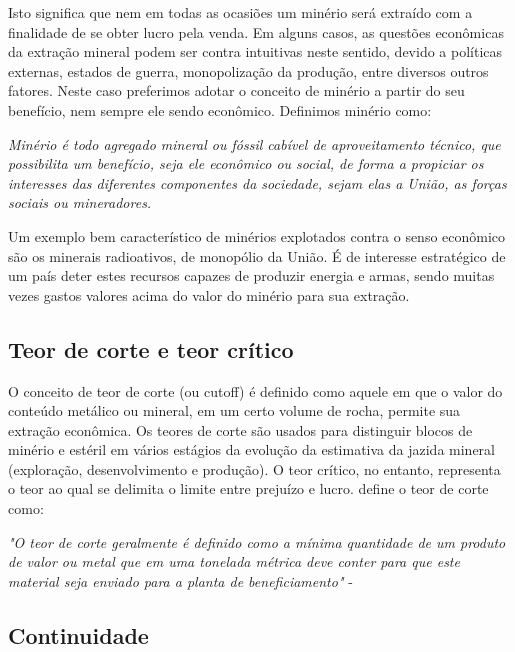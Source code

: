 Isto significa que nem em todas as ocasiões um minério será extraído com a finalidade de se obter lucro pela venda. Em alguns casos, as questões econômicas da extração mineral podem ser contra intuitivas neste sentido, devido a políticas externas, estados de guerra, monopolização da produção, entre diversos outros fatores. Neste caso preferimos adotar o conceito de minério a partir do seu benefício, nem sempre ele sendo econômico. Definimos minério como: 

\begin{definition}[Minério]
	\textit{Minério é todo agregado mineral ou fóssil cabível de aproveitamento técnico, que possibilita um benefício, seja ele econômico ou social, de forma a propiciar os interesses das diferentes componentes da sociedade, sejam elas a União, as forças sociais ou mineradores.}
\end{definition}

Um exemplo bem característico de minérios explotados contra o senso econômico são os minerais radioativos, de monopólio da União. É de interesse estratégico de um país deter estes recursos capazes de produzir energia e armas, sendo muitas vezes gastos valores acima do valor do minério para sua extração. 


\subsection{Teor de corte e teor crítico}

O conceito de teor de corte (ou cutoff) é definido como aquele em que o valor do conteúdo metálico ou mineral, em um certo volume de rocha, permite sua extração econômica. Os teores de corte são usados para distinguir blocos de minério e estéril em vários estágios da evolução da estimativa da jazida mineral (exploração, desenvolvimento e produção). O teor crítico, no entanto, representa o teor ao qual se delimita o limite entre prejuízo e lucro. \citet{rendu2014introduction} define o teor de corte como:


\begin{remark}
	\textit{"O teor de corte geralmente é definido como a mínima quantidade de um produto de valor ou metal que em uma tonelada métrica deve conter para que este material seja enviado para a planta de beneficiamento"} - \cite{rendu2014introduction}
\end{remark}

\subsection{Continuidade}

